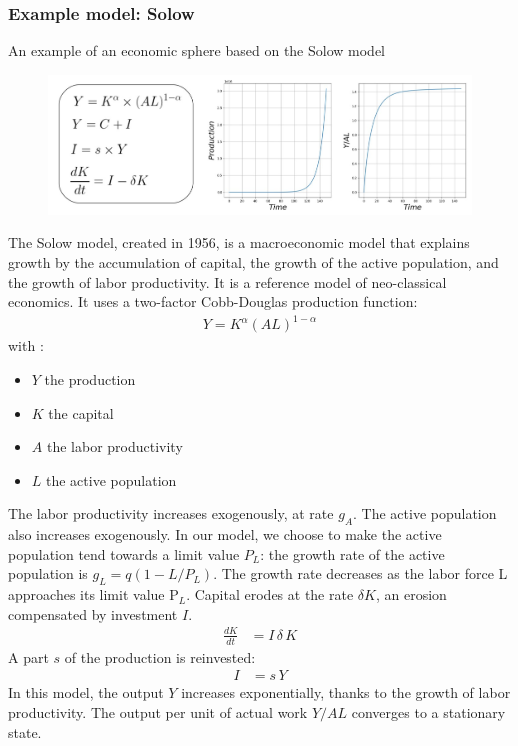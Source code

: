 \documentclass[12pt,a4paper]{article}%
\begin{document}
\begin{appendix}
\subsubsection{{Example model: Solow}} 
{An example of an economic sphere based on the Solow model}  
\begin{figure}[h] 
	\centering 
	\includegraphics[width=1.0\textwidth]{figures/solow2.jpg}
\end{figure} 
The Solow model, created in 1956, is a macroeconomic model that explains growth by the accumulation of capital, the growth of the active population, and the growth of labor productivity. It is a reference model of neo-classical economics.  It uses a two-factor Cobb-Douglas production function:
\begin{align}
	Y=K^{\alpha}(AL)^{1-\alpha}
\end{align}  with :  
\begin{itemize} 
	\item $Y$ the production 
	\item $K$ the capital 
	\item $A$ the labor productivity 
	\item $L$ the active population 
\end{itemize} 
The labor productivity increases exogenously, at rate $g_{A }$.  The active population also increases exogenously. In our model, we choose to make the active population tend towards a limit value $P_{L}$: the growth rate of the active population is $g_{L}=q(1-L/P_{L})$. The growth rate decreases as the labor force L approaches its limit value P$_{L}$.  Capital erodes at the rate $\delta K$, an erosion compensated by investment $I$.  
\begin{align}
	\frac{d K}{d t} & = I \, \delta \, K
\end{align} 
A part $s$ of the production is reinvested:  
\begin{align}
	I &= s \, Y 
\end{align}
In this model, the output $Y$ increases exponentially, thanks to the growth of labor productivity. The output per unit of actual work $Y/AL$ converges to a stationary state.  


\end{appendix}
\end{document}

